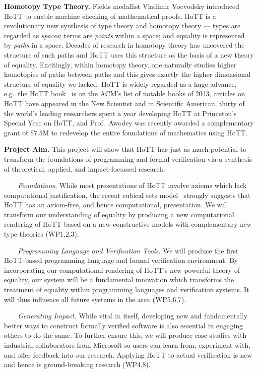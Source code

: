 \documentclass[a4paper,11pt]{article}
\newcommand{\eg}{{e.g.}\ }
\begin{document}
{\bf Homotopy Type Theory.} Fields medallist Vladimir Voevodsky
introduced HoTT to enable machine checking of mathematical proofs.
HoTT is a revolutionary new synthesis of type theory and homotopy
theory --- types are regarded as \emph{spaces}; terms are
\emph{points} within a space; and equality is represented by
\emph{paths} in a space. Decades of research in homotopy theory has
uncovered the structure of such paths and HoTT uses this structure as
the basis of a new theory of equality. Excitingly, within homotopy
theory, one naturally studies higher homotopies of paths between paths
and this gives exactly the higher dimensional structure of equality we
lacked.  HoTT is widely regarded as a huge advance, \eg the HoTT
book~\cite{hott-book} is on the ACM's list of notable books of 2013,
articles on HoTT have appeared in the New Scientist and in Scientific
American, thirty of the world's leading researchers spent a year
developing HoTT at Princeton's Special Year on HoTT, and Prof.\ Awodey
was recently awarded a complementary grant of $\$ 7.5$M to redevelop
the entire foundations of mathematics using HoTT.


{\bf Project Aim.}  This project will show that HoTT has just as much
potential to transform the foundations of programming and formal
verification via a synthesis of theoretical, applied, and
impact-focussed research:

$\;\;\; \;\;\;$ {\em Foundations.}  While most presentations of HoTT
involve axioms which lack computational justification, the
recent cubical sets model~\cite{BezemM:cubsmt,nominal} strongly
suggests that HoTT has an axiom-free, and hence computational,
presentation. We will transform our understanding of
equality by producing a new
computational rendering of HoTT based on a new constructive models
with complementary new type theories (WP1,2,3). 

$\;\;\;\;\;\;$ {\em Programming Language and Verification Tools.}  
We will produce the first HoTT-based
programming language and formal verification
environment. By incorporating our computational rendering of HoTT's new
powerful theory of equality, our system will be a fundamental
innovation which transforms the treatment of equality within
programming languages and verification systems. It will thus influence all
future systems in the area (WP5,6,7).

$\;\;\;\;\;\;$ {\em Generating Impact.} %
While vital in itself, developing new and fundamentally better ways to
construct formally verified software is also essential in
engaging others to do the same. To further ensure this, we will produce case
studies with industrial collaborators from Microsoft so users can
learn from, experiment with, and offer feedback into our research. Applying HoTT to
actual verification is new and hence is ground-breaking research (WP4,8).
\end{document}
